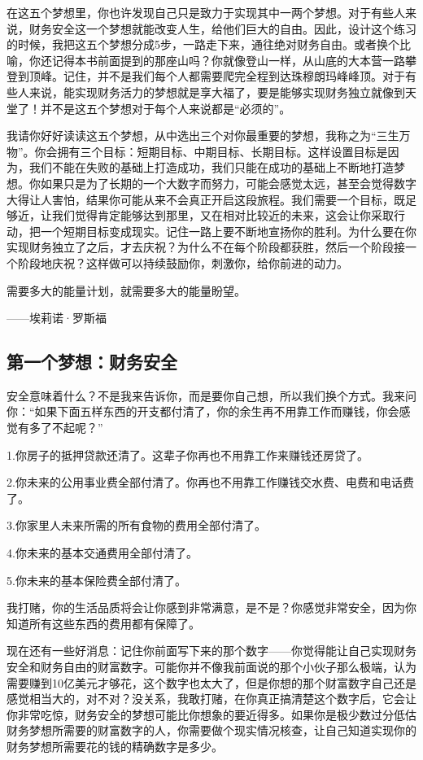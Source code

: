 在这五个梦想里，你也许发现自己只是致力于实现其中一两个梦想。对于有些人来说，财务安全这一个梦想就能改变人生，给他们巨大的自由。因此，设计这个练习的时候，我把这五个梦想分成5步，一路走下来，通往绝对财务自由。或者换个比喻，你还记得本书前面提到的那座山吗？你就像登山一样，从山底的大本营一路攀登到顶峰。记住，并不是我们每个人都需要爬完全程到达珠穆朗玛峰峰顶。对于有些人来说，能实现财务活力的梦想就是享大福了，要是能够实现财务独立就像到天堂了！并不是这五个梦想对于每个人来说都是“必须的”。

我请你好好读读这五个梦想，从中选出三个对你最重要的梦想，我称之为“三生万物”。你会拥有三个目标：短期目标、中期目标、长期目标。这样设置目标是因为，我们不能在失败的基础上打造成功，我们只能在成功的基础上不断地打造梦想。你如果只是为了长期的一个大数字而努力，可能会感觉太远，甚至会觉得数字大得让人害怕，结果你可能从来不会真正开启这段旅程。我们需要一个目标，既足够近，让我们觉得肯定能够达到那里，又在相对比较近的未来，这会让你采取行动，把一个短期目标变成现实。记住一路上要不断地宣扬你的胜利。为什么要在你实现财务独立了之后，才去庆祝？为什么不在每个阶段都获胜，然后一个阶段接一个阶段地庆祝？这样做可以持续鼓励你，刺激你，给你前进的动力。

\begin{BookQuote}
需要多大的能量计划，就需要多大的能量盼望。

\hfill ——埃莉诺·罗斯福
\end{BookQuote}

\subsection{第一个梦想：财务安全}

安全意味着什么？不是我来告诉你，而是要你自己想，所以我们换个方式。我来问你：“如果下面五样东西的开支都付清了，你的余生再不用靠工作而赚钱，你会感觉有多了不起呢？”

1.你房子的抵押贷款还清了。这辈子你再也不用靠工作来赚钱还房贷了。

2.你未来的公用事业费全部付清了。你再也不用靠工作赚钱交水费、电费和电话费了。

3.你家里人未来所需的所有食物的费用全部付清了。

4.你未来的基本交通费用全部付清了。

5.你未来的基本保险费全部付清了。

我打赌，你的生活品质将会让你感到非常满意，是不是？你感觉非常安全，因为你知道所有这些东西的费用都有保障了。

现在还有一些好消息：记住你前面写下来的那个数字——你觉得能让自己实现财务安全和财务自由的财富数字。可能你并不像我前面说的那个小伙子那么极端，认为需要赚到10亿美元才够花，这个数字也太大了，但是你想的那个财富数字自己还是感觉相当大的，对不对？没关系，我敢打赌，在你真正搞清楚这个数字后，它会让你非常吃惊，财务安全的梦想可能比你想象的要近得多。如果你是极少数过分低估财务梦想所需要的财富数字的人，你需要做个现实情况核查，让自己知道实现你的财务梦想所需要花的钱的精确数字是多少。


